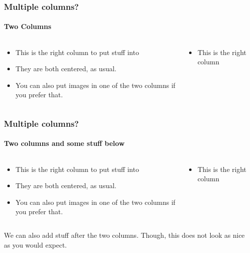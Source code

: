 \documentclass[10pt]{beamer}
\begin{document}
\begin{frame}
  \frametitle{Multiple columns?}
  \framesubtitle{Two Columns}
  \begin{columns}
    \begin{column}{0.5\textwidth}
      \begin{itemize}
        \item 
          This is the right column to put stuff into
        \item
          They are both centered, as usual.
        \item
          You can also put images in one of the two columns if you prefer
          that.
      \end{itemize}
    \end{column}
    \begin{column}{0.5\textwidth}
      \begin{itemize}
        \item 
          This is the right column
      \end{itemize}
    \end{column}
  \end{columns}
\end{frame}

\begin{frame}
  \frametitle{Multiple columns?}
  \framesubtitle{Two columns and some stuff below}
  \begin{columns}
    \begin{column}{0.5\textwidth}
      \begin{itemize}
        \item 
          This is the right column to put stuff into
        \item
          They are both centered, as usual.
        \item
          You can also put images in one of the two columns if you prefer
          that.
      \end{itemize}
    \end{column}
    \begin{column}{0.5\textwidth}
      \begin{itemize}
        \item 
          This is the right column
      \end{itemize}
    \end{column}
  \end{columns}
  \begin{alertblock}{}
    We can also add stuff after the two columns. Though, this does not look 
    as nice as you would expect.
  \end{alertblock}
\end{frame}
\end{document}

